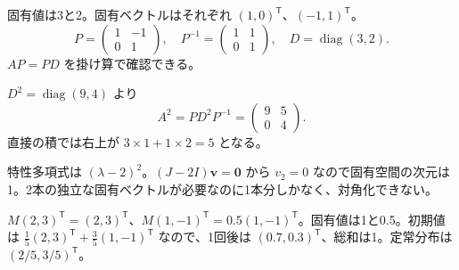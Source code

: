 \documentclass[11pt]{article}
\begin{document}

\problem[対角化]
\begin{ans}
固有値は3と2。固有ベクトルはそれぞれ $(1,0)^{\mathsf T}$、$(-1,1)^{\mathsf T}$。\[P=\begin{pmatrix}1&-1\\0&1\end{pmatrix},\quad P^{-1}=\begin{pmatrix}1&1\\0&1\end{pmatrix},\quad D=\operatorname{diag}(3,2).\] $AP=PD$ を掛け算で確認できる。
\end{ans}

\problem[累乗]
\begin{ans}
$D^2=\operatorname{diag}(9,4)$ より \[A^2=PD^2P^{-1}=\begin{pmatrix}9&5\\0&4\end{pmatrix}.\] 直接の積では右上が $3\times1+1\times2=5$ となる。
\end{ans}
\newpage

\problem[対角化できない例]
\begin{ans}
特性多項式は $(\lambda-2)^2$。$(J-2I)\boldsymbol v=\boldsymbol0$ から $v_2=0$ なので固有空間の次元は1。2本の独立な固有ベクトルが必要なのに1本分しかなく、対角化できない。
\end{ans}

\problem[状態遷移]
\begin{ans}
$M(2,3)^{\mathsf T}=(2,3)^{\mathsf T}$、$M(1,-1)^{\mathsf T}=0.5(1,-1)^{\mathsf T}$。固有値は1と0.5。初期値は $\frac15(2,3)^{\mathsf T}+\frac35(1,-1)^{\mathsf T}$ なので、1回後は $(0.7,0.3)^{\mathsf T}$、総和は1。定常分布は $(2/5,3/5)^{\mathsf T}$。
\end{ans}
\end{document}
